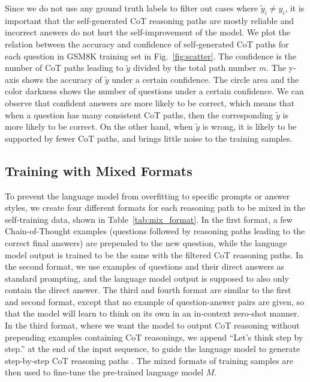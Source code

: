 
Since we do not use any ground truth labels to filter out cases where $\tilde{y}_i\neq y_i$, it is important that the self-generated CoT reasoning paths are mostly reliable and incorrect answers do not hurt the self-improvement of the model.
We plot the relation between the accuracy and confidence of self-generated CoT paths for each question in GSM8K training set in Fig.~\ref{fig:scatter}. 
The confidence is the number of CoT paths leading to $\tilde{y}$ divided by the total path number $m$. The y-axis shows the accuracy of $\tilde{y}$ under a certain confidence. The circle area and the color darkness shows the number of questions under a certain confidence. 
We can observe that confident answers are more likely to be correct, which means that when a question has many consistent CoT paths, then the corresponding $\tilde{y}$ is more likely to be correct. On the other hand, when $\tilde{y}$ is wrong, it is likely to be supported by fewer CoT paths, and brings little noise to the training samples.


\subsection{Training with Mixed Formats}\label{sec:mix_formats}
To prevent the language model from overfitting to specific prompts or answer styles, we create four different formats for each reasoning path to be mixed in the self-training data, shown in Table~\ref{tab:mix_format}. In the first format, a few Chain-of-Thought examples (questions followed by reasoning paths leading to the correct final answers) are prepended to the new question, while the language model output is trained to be the same with the filtered CoT reasoning paths. In the second format, we use examples of questions and their direct answers as standard prompting, and the language model output is supposed to also only contain the direct answer. The third and fourth format are similar to the first and second format, except that no example of question-answer pairs are given, so that the model will learn to think on its own in an in-context zero-shot manner. In the third format, where we want the model to output CoT reasoning without prepending examples containing CoT reasonings, we append ``Let's think step by step.'' at the end of the input sequence, to guide the language model to generate step-by-step CoT reasoning paths \citep{step_by_step}. The mixed formats of training samples are then used to fine-tune the pre-trained language model $M$.


